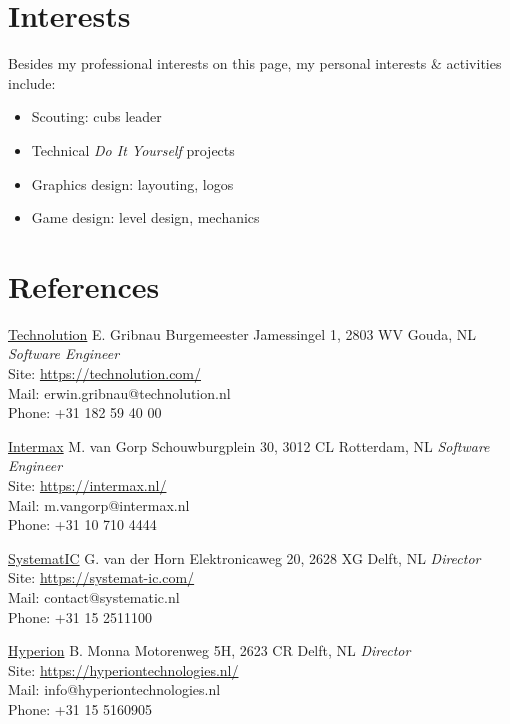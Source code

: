 \documentclass[]{cv-timvisee}
\providecommand{\tightlist}{%
\setlength{\itemsep}{0pt}\setlength{\parskip}{0pt}}
\begin{document}
\section{Interests}

Besides my professional interests on this page, my personal interests \&
activities include:

{\setlength\multicolsep{3pt}%
\begin{multicols}{2}
\begin{itemize}
  \tightlist{}
  \item Scouting: cubs leader
  \item Technical \emph{Do It Yourself} projects
  \item Graphics design: layouting, logos
  \item Game design: level design, mechanics
\end{itemize}
\end{multicols}}


\newpage

\section{References}

\begin{entrylist}

\entry
{\href{https://technolution.com}{Technolution}}
{E. Gribnau}
{Burgemeester Jamessingel 1, 2803 WV Gouda, NL}
{\emph{Software Engineer} \\
Site: \href{https://technolution.com}{https://technolution.com/} \\
Mail: erwin.gribnau@technolution.nl \\
Phone: +31 182 59 40 00}

\entry
{\href{https://intermax.nl}{Intermax}}
{M. van Gorp}
{Schouwburgplein 30, 3012 CL Rotterdam, NL}
{\emph{Software Engineer} \\
Site: \href{https://intermax.nl}{https://intermax.nl/} \\
Mail: m.vangorp@intermax.nl \\
Phone: +31 10 710 4444}

\entry
{\href{https://systemat-ic.com}{SystematIC}}
{G. van der Horn}
{Elektronicaweg 20, 2628 XG Delft, NL}
{\emph{Director} \\
Site: \href{https://systemat-ic.com/}{https://systemat-ic.com/} \\
Mail: contact@systematic.nl \\
Phone: +31 15 2511100}

\entry
{\href{https://hyperiontechnologies.nl/}{Hyperion}}
{B. Monna}
{Motorenweg 5H, 2623 CR Delft, NL}
{\emph{Director} \\
Site: \href{https://hyperiontechnologies.nl/}{https://hyperiontechnologies.nl/} \\
Mail: info@hyperiontechnologies.nl \\
Phone: +31 15 5160905}

\end{entrylist}
\end{document}
